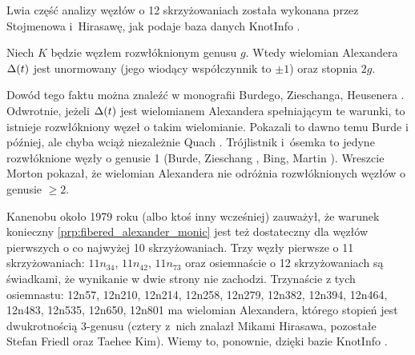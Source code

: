 Lwia część analizy węzłów o 12 skrzyżowaniach została wykonana przez Stojmenowa i~Hirasawę, jak podaje baza danych KnotInfo \cite{knotinfo24}.
%
%

\begin{proposition}
%
\label{prp:fibered_alexander_monic}%
    Niech $K$ będzie węzłem rozwłóknionym genusu $g$.
    Wtedy wielomian Alexandera $\Delta(t)$ jest unormowany (jego wiodący współczynnik to $\pm 1$) oraz stopnia $2g$.
\end{proposition}

Dowód tego faktu można znaleźć w monografii Burdego, Zieschanga, Heusenera \cite[s. 130]{burde14}.
Odwrotnie, jeżeli $\Delta(t)$ jest wielomianem Alexandera spełniającym te warunki, to istnieje rozwłókniony węzeł o takim wielomianie.
Pokazali to dawno temu Burde \cite{burde66} i później, ale chyba wciąż niezależnie Quach \cite{quach79}.
Trójlistnik i~ósemka to jedyne rozwłóknione węzły o genusie 1 (Burde, Zieschang \cite{zieschang67}, Bing, Martin \cite{martin71}).
Wreszcie Morton \cite{morton83} pokazał, że wielomian Alexandera nie odróżnia rozwłóknionych węzłów o genusie $\ge 2$.


Kanenobu około 1979 roku (albo ktoś inny wcześniej) zauważył, że warunek konieczny \ref{prp:fibered_alexander_monic} jest też dostateczny dla węzłów pierwszych o co najwyżej 10 skrzyżowaniach.
Trzy węzły pierwsze o 11 skrzyżowaniach: $11n_{34}$, $11n_{42}$, $11n_{73}$ oraz osiemnaście o 12 skrzyżowaniach są świadkami, że wynikanie w dwie strony nie zachodzi.
Trzynaście z tych osiemnastu: 12n57, 12n210, 12n214, 12n258, 12n279, 12n382, 12n394, 12n464, 12n483, 12n535, 12n650, 12n801 ma wielomian Alexandera, którego stopień jest dwukrotnością 3-genusu (cztery z~nich znalazł Mikami Hirasawa, pozostałe Stefan Friedl oraz Taehee Kim).
%
%
%
Wiemy to, ponownie, dzięki bazie KnotInfo \cite{knotinfo24}.

